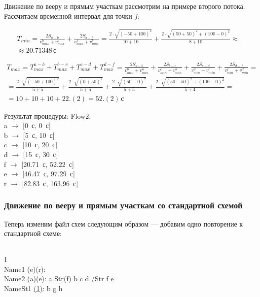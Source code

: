\documentclass[12pt]{article}
\theoremstyle{plain}
\begin{document}
Движение по вееру и прямым участкам рассмотрим на примере второго потока. Рассчитаем временной интервал для точки $f$:

\begin{multline}
T_{min} = \frac{2S_{a-b}}{v_{max}^b + v_{max}^a} + \frac{2S_{b-f}}{v_{max}^f + v_{max}^b}
= \frac{2\cdot\sqrt{(-50 + 100)^2}}{10 + 10} + \frac{2\cdot\sqrt{(50 + 50)^2 + (100-0)^2}}{8 + 10} \approx \\
 \approx 20.71348\,\text{с}
\end{multline}

\begin{multline}
T_{max} = T_{max}^{a-b} + T_{max}^{b-c} + T_{max}^{c-d} + T_{max}^{d-f} = 
 \frac{2S_{a-b}}{v_{min}^b + v_{min}^a} + \frac{2S_{b-c}}{v_{min}^c + v_{min}^b} +
 \frac{2S_{c-d}}{v_{min}^d + v_{min}^c} + \frac{2S_{d-f}}{v_{min}^f + v_{min}^d} = \\
 =\frac{2\cdot\sqrt{(-50 + 100)^2}}{5 + 5} + \frac{2\cdot\sqrt{(0 + 50)^2}}{5 + 5} +
 \frac{2\cdot\sqrt{(50 - 0)^2}}{5 + 5} + \frac{2\cdot\sqrt{(50 - 50)^2 + (100-0)^2}}{5 + 4} = \\
 = 10 + 10 + 10 + 22.(2) = 52.(2)\,\text{с}
\end{multline}


Результат процедуры:
Flow2:\\
a $\rightarrow$ [0~с, 0~с]\\
b $\rightarrow$ [5~с, 10~с]\\
c $\rightarrow$ [10~с, 20~с]\\
d $\rightarrow$ [15~с, 30~с]\\
f $\rightarrow$ [20.71~с, 52.22~с]\\
e $\rightarrow$ [46.47~с, 97.29~с]\\
r $\rightarrow$ [82.83~с, 163.96~с]\\



\subsubsection{Движение по вееру и прямым участкам со стандартной схемой}

Теперь изменим файл схем следующим образом --- добавим одно повторение к стандартной схеме:

\\
1\\
Name1 (e)(r):\\
Name2 (a)(e): a Str(f) b c d /Str f e\\
NameSt1 \underline{(1)}: b g h
\end{document}
